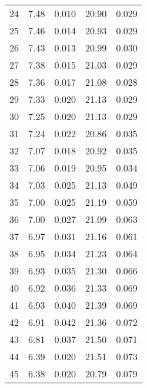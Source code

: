 \begin{table}
\begin{tabular}{c|ll|ll}
24 & 7.48 & 0.010 & 20.90 & 0.029 \\
25 & 7.46 & 0.014 & 20.93 & 0.029 \\
26 & 7.43 & 0.013 & 20.99 & 0.030 \\
27 & 7.38 & 0.015 & 21.03 & 0.029 \\
28 & 7.36 & 0.017 & 21.08 & 0.028 \\
29 & 7.33 & 0.020 & 21.13 & 0.029 \\
30 & 7.25 & 0.020 & 21.13 & 0.029 \\
31 & 7.24 & 0.022 & 20.86 & 0.035 \\
32 & 7.07 & 0.018 & 20.92 & 0.035 \\
33 & 7.06 & 0.019 & 20.95 & 0.034 \\
34 & 7.03 & 0.025 & 21.13 & 0.049 \\
35 & 7.00 & 0.025 & 21.19 & 0.059 \\
36 & 7.00 & 0.027 & 21.09 & 0.063 \\
37 & 6.97 & 0.031 & 21.16 & 0.061 \\
38 & 6.95 & 0.034 & 21.23 & 0.064 \\
39 & 6.93 & 0.035 & 21.30 & 0.066 \\
40 & 6.92 & 0.036 & 21.33 & 0.069 \\
41 & 6.93 & 0.040 & 21.39 & 0.069 \\
42 & 6.91 & 0.042 & 21.36 & 0.072 \\
43 & 6.81 & 0.037 & 21.50 & 0.071 \\
44 & 6.39 & 0.020 & 21.51 & 0.073 \\
45 & 6.38 & 0.020 & 20.79 & 0.079 \\
               \hline
        \end{tabular}
    \end{table}
    \clearpage


